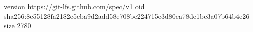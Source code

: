 version https://git-lfs.github.com/spec/v1
oid sha256:8c55128fa2182e5eba9d2add58e708be224715e3d80ea78de1bc3a07b64b4e26
size 2780
